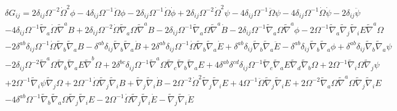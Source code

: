 \documentclass[aps]{revtex4}
\begin{document}
\begin{eqnarray}
&&\delta G_{ij}=2 \delta_{ij} \Omega^{-2} \dot{\Omega}^2 \phi - 4 \delta_{ij} \Omega^{-1} \ddot{\Omega} \phi - 2 \delta_{ij} \Omega^{-1} \dot{\Omega} \dot{\phi} + 2 \delta_{ij} \Omega^{-2} \dot{\Omega}^2 \psi - 4 \delta_{ij} \Omega^{-1} \ddot{\Omega} \psi - 4 \delta_{ij} \Omega^{-1} \dot{\Omega} \dot{\psi} - 2 \delta_{ij} \ddot{\psi} 
\nonumber\\
&&- 4 \delta_{ij} \Omega^{-1} \tilde{\nabla}_{a}\dot{\Omega} \tilde{\nabla}^{a}B 
+ 2 \delta_{ij} \Omega^{-2} \dot{\Omega} \tilde{\nabla}_{a}\Omega \tilde{\nabla}^{a}B - 2 \delta_{ij} \Omega^{-1} \tilde{\nabla}_{a}\Omega \tilde{\nabla}^{a}\dot{B} - 2 \delta_{ij} \Omega^{-1} \tilde{\nabla}_{a}\Omega \tilde{\nabla}^{a}\phi - 2 \Omega^{-1} \tilde{\nabla}_{a}\tilde{\nabla}_{j}\tilde{\nabla}_{i}E \tilde{\nabla}^{a}\Omega 
\nonumber\\
&&- 2 \delta^{ab} \delta_{ij} \Omega^{-1} \dot{\Omega} \tilde{\nabla}_{b}\tilde{\nabla}_{a}B 
-  \delta^{ab} \delta_{ij} \tilde{\nabla}_{b}\tilde{\nabla}_{a}\dot{B} + 2 \delta^{ab} \delta_{ij} \Omega^{-1} \dot{\Omega} \tilde{\nabla}_{b}\tilde{\nabla}_{a}\dot{E} + \delta^{ab} \delta_{ij} \tilde{\nabla}_{b}\tilde{\nabla}_{a}\ddot{E} -  \delta^{ab} \delta_{ij} \tilde{\nabla}_{b}\tilde{\nabla}_{a}\phi + \delta^{ab} \delta_{ij} \tilde{\nabla}_{b}\tilde{\nabla}_{a}\psi 
\nonumber\\
&&- 2 \delta_{ij} \Omega^{-2} \tilde{\nabla}^{a}\Omega \tilde{\nabla}_{b}\tilde{\nabla}_{a}E \tilde{\nabla}^{b}\Omega 
+ 2 \delta^{bc} \delta_{ij} \Omega^{-1} \tilde{\nabla}^{a}\Omega \tilde{\nabla}_{c}\tilde{\nabla}_{b}\tilde{\nabla}_{a}E + 4 \delta^{ab} \delta^{cd} \delta_{ij} \Omega^{-1} \tilde{\nabla}_{c}\tilde{\nabla}_{a}E \tilde{\nabla}_{d}\tilde{\nabla}_{b}\Omega + 2 \Omega^{-1} \tilde{\nabla}_{i}\Omega \tilde{\nabla}_{j}\psi 
\nonumber\\
&&+ 2 \Omega^{-1} \tilde{\nabla}_{i}\psi \tilde{\nabla}_{j}\Omega + 2 \Omega^{-1} \dot{\Omega} \tilde{\nabla}_{j}\tilde{\nabla}_{i}B 
+ \tilde{\nabla}_{j}\tilde{\nabla}_{i}\dot{B} - 2 \Omega^{-2} \dot{\Omega}^2 \tilde{\nabla}_{j}\tilde{\nabla}_{i}E + 4 \Omega^{-1} \ddot{\Omega} \tilde{\nabla}_{j}\tilde{\nabla}_{i}E + 2 \Omega^{-2} \tilde{\nabla}_{a}\Omega \tilde{\nabla}^{a}\Omega \tilde{\nabla}_{j}\tilde{\nabla}_{i}E 
\nonumber\\
&&- 4 \delta^{ab} \Omega^{-1} \tilde{\nabla}_{b}\tilde{\nabla}_{a}\Omega \tilde{\nabla}_{j}\tilde{\nabla}_{i}E - 2 \Omega^{-1} \dot{\Omega} \tilde{\nabla}_{j}\tilde{\nabla}_{i}\dot{E} 
-  \tilde{\nabla}_{j}\tilde{\nabla}_{i}\ddot{E} 

\end{eqnarray}
\end{document}
